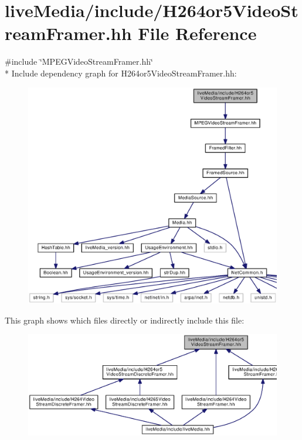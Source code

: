 \section{live\+Media/include/\+H264or5\+Video\+Stream\+Framer.hh File Reference}
\label{H264or5VideoStreamFramer_8hh}
{\ttfamily \#include \char`\"{}M\+P\+E\+G\+Video\+Stream\+Framer.\+hh\char`\"{}}\\*
Include dependency graph for H264or5\+Video\+Stream\+Framer.\+hh\+:
\nopagebreak
\begin{figure}[H]
\begin{center}
\leavevmode
\includegraphics[width=350pt]{H264or5VideoStreamFramer_8hh__incl}
\end{center}
\end{figure}
This graph shows which files directly or indirectly include this file\+:
\nopagebreak
\begin{figure}[H]
\begin{center}
\leavevmode
\includegraphics[width=350pt]{H264or5VideoStreamFramer_8hh__dep__incl}
\end{center}
\end{figure}
